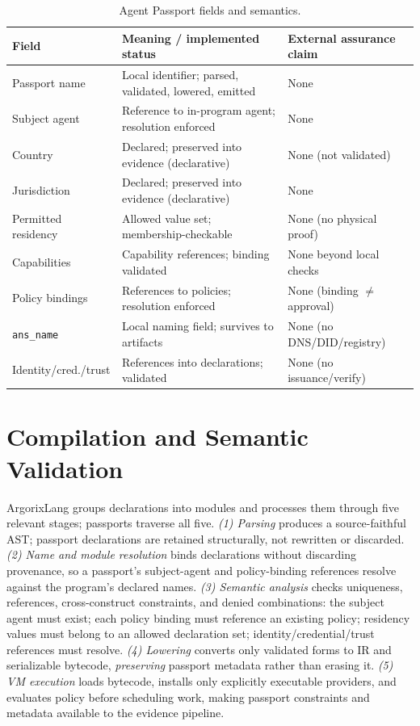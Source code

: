 \documentclass[conference]{IEEEtran}
\newcommand{\code}[1]{\texttt{\small #1}}
\newcommand{\Argorix}{%
\textcolor{argViolet}{A}\textcolor{argViolet}{r}\textcolor{argIndigo}{g}\textcolor{argIndigo}{o}\textcolor{argElectric}{r}\textcolor{argElectric}{i}\textcolor{argElectric}{x}\textcolor{argCyan}{L}\textcolor{argCyan}{a}\textcolor{argCyanBright}{n}\textcolor{argCyanBright}{g}\xspace}
\begin{document}
\begin{table}[t]
\centering
\caption{Agent Passport fields and semantics.}
\label{tab:fields}
\renewcommand{\arraystretch}{1.2}
\footnotesize
\begin{tabular}{@{}p{}p{}p{}@{}}
\toprule
\textbf{Field} & \textbf{Meaning / implemented status} & \textbf{External assurance claim} \\
\midrule
Passport name & Local identifier; parsed, validated, lowered, emitted & None \\
Subject agent & Reference to in-program agent; resolution enforced & None \\
Country & Declared; preserved into evidence (declarative) & None (not validated) \\
Jurisdiction & Declared; preserved into evidence (declarative) & None \\
Permitted residency & Allowed value set; membership-checkable & None (no physical proof) \\
Capabilities & Capability references; binding validated & None beyond local checks \\
Policy bindings & References to policies; resolution enforced & None (binding $\neq$ approval) \\
\code{ans\_name} & Local naming field; survives to artifacts & None (no DNS/DID/registry) \\
Identity/\allowbreak cred./\allowbreak trust & References into declarations; validated & None (no issuance/\allowbreak verify) \\
\bottomrule
\end{tabular}
\end{table}

\section{Compilation and Semantic Validation}\label{sec:compile}
\Argorix groups declarations into modules and processes them through five
relevant stages; passports traverse all five.
\emph{(1) Parsing} produces a source-faithful AST; passport declarations are
retained structurally, not rewritten or discarded.
\emph{(2) Name and module resolution} binds declarations without discarding
provenance, so a passport's subject-agent and policy-binding references resolve
against the program's declared names.
\emph{(3) Semantic analysis} checks uniqueness, references, cross-construct
constraints, and denied combinations: the subject agent must exist; each policy
binding must reference an existing policy; residency values must belong to an
allowed declaration set; identity/credential/trust references must resolve.
\emph{(4) Lowering} converts only validated forms to IR and serializable
bytecode, \emph{preserving} passport metadata rather than erasing it.
\emph{(5) VM execution} loads bytecode, installs only explicitly executable
providers, and evaluates policy before scheduling work, making passport
constraints and metadata available to the evidence pipeline.
\end{document}
